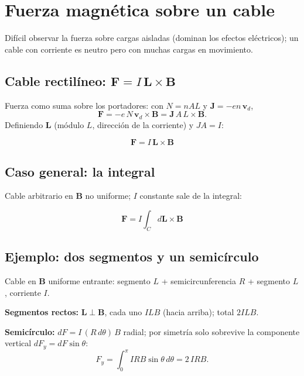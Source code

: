 \documentclass[12pt,a4paper]{article}
\begin{document}
\section{Fuerza magnética sobre un cable}

Difícil observar la fuerza sobre cargas aisladas (dominan los efectos
eléctricos); un cable con corriente es neutro pero con muchas cargas en
movimiento.

\subsection{Cable rectilíneo: $\mathbf{F} = I\,\mathbf{L}\times\mathbf{B}$}

Fuerza como suma sobre los portadores: con $N = nAL$ y
$\mathbf{J} = -en\,\mathbf{v}_d$,
\[
\mathbf{F} = -e\,N\,\mathbf{v}_d\times\mathbf{B}
           = \mathbf{J}\,A\,L\times\mathbf{B}.
\]
Definiendo $\mathbf{L}$ (módulo $L$, dirección de la corriente) y
$JA = I$:

\begin{keybox}
  \[
  \boxed{\mathbf{F} = I\,\mathbf{L}\times\mathbf{B}}
  \]
\end{keybox}

\subsection{Caso general: la integral}

Cable arbitrario en $\mathbf{B}$ no uniforme; $I$ constante sale de la
integral:

\begin{keybox}
  \[
  \boxed{\mathbf{F} = I\int_C d\mathbf{L}\times\mathbf{B}}
  \]
\end{keybox}

\subsection{Ejemplo: dos segmentos y un semicírculo}

Cable en $\mathbf{B}$ uniforme entrante: segmento $L$ +
semicircunferencia $R$ + segmento $L$, corriente $I$.

\textbf{Segmentos rectos:} $\mathbf{L}\perp\mathbf{B}$, cada uno $ILB$
(hacia arriba); total $2ILB$.

\textbf{Semicírculo:} $dF = I\,(R\,d\theta)\,B$ radial; por simetría solo
sobrevive la componente vertical $dF_y = dF\sin\theta$:
\[
F_y = \int_0^{\pi} I R B \sin\theta\, d\theta = 2\,I R B.
\]
\end{document}
